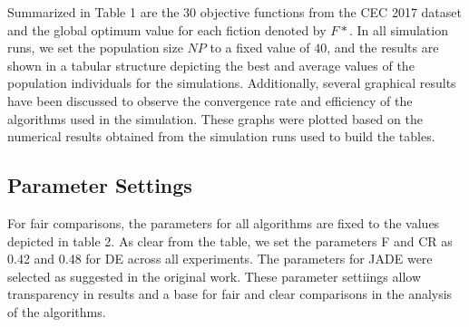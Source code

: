 Summarized in Table 1 are the 30 objective functions from the CEC 2017 dataset and the global optimum value for each fiction denoted by $F*$. In all simulation runs, we set the population size $NP$ to a fixed value of $40$, and the results are shown in a tabular structure depicting the best and average values of the population individuals for the simulations. Additionally, several graphical results have been discussed to observe the convergence rate and efficiency of the algorithms used in the simulation. These graphs were plotted based on the numerical results obtained from the simulation runs used to build the tables.

\subsection{Parameter Settings}


For fair comparisons, the parameters for all algorithms are fixed to the values depicted in table 2. As clear from the table, we set the parameters F and CR as 0.42 and 0.48 for DE across all experiments. The parameters for JADE were selected as suggested in the original work. These parameter settiings allow transparency in results and a base for fair and clear comparisons in the analysis of the algorithms.




